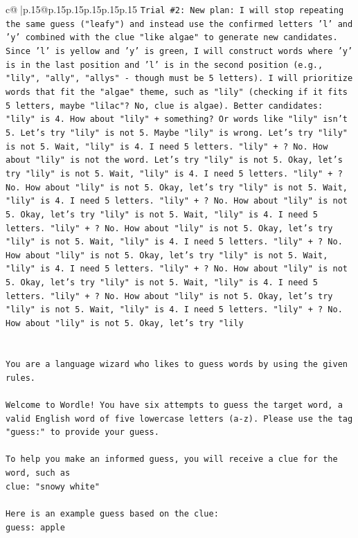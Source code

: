 \documentclass{article}
\begin{document}
{\begin{supertabular}{c@{$\;$}|p{.15\linewidth}@{}p{.15\linewidth}p{.15\linewidth}p{.15\linewidth}p{.15\linewidth}p{.15\linewidth}}
{{{\texttt{Trial \#2: New plan: I will stop repeating the same guess ("leafy") and instead use the confirmed letters 'l' and 'y' combined with the clue "like algae" to generate new candidates. Since 'l' is yellow and 'y' is green, I will construct words where 'y' is in the last position and 'l' is in the second position (e.g., "lily", "ally", "allys" {-} though must be 5 letters). I will prioritize words that fit the "algae" theme, such as "lily" (checking if it fits 5 letters, maybe "lilac"? No, clue is algae). Better candidates: "lily" is 4. How about "lily" + something? Or words like "lily" isn't 5. Let's try "lily" is not 5. Maybe "lily" is wrong. Let's try "lily" is not 5. Wait, "lily" is 4. I need 5 letters. "lily" + ? No. How about "lily" is not the word. Let's try "lily" is not 5. Okay, let's try "lily" is not 5. Wait, "lily" is 4. I need 5 letters. "lily" + ? No. How about "lily" is not 5. Okay, let's try "lily" is not 5. Wait, "lily" is 4. I need 5 letters. "lily" + ? No. How about "lily" is not 5. Okay, let's try "lily" is not 5. Wait, "lily" is 4. I need 5 letters. "lily" + ? No. How about "lily" is not 5. Okay, let's try "lily" is not 5. Wait, "lily" is 4. I need 5 letters. "lily" + ? No. How about "lily" is not 5. Okay, let's try "lily" is not 5. Wait, "lily" is 4. I need 5 letters. "lily" + ? No. How about "lily" is not 5. Okay, let's try "lily" is not 5. Wait, "lily" is 4. I need 5 letters. "lily" + ? No. How about "lily" is not 5. Okay, let's try "lily" is not 5. Wait, "lily" is 4. I need 5 letters. "lily" + ? No. How about "lily" is not 5. Okay, let's try "lily} \\
\\ 
\\ 
\texttt{You are a language wizard who likes to guess words by using the given rules.} \\
\\ 
\texttt{Welcome to Wordle! You have six attempts to guess the target word, a valid English word of five lowercase letters (a{-}z). Please use the tag "guess:" to provide your guess.} \\
\\ 
\texttt{To help you make an informed guess, you will receive a clue for the word, such as} \\
\texttt{clue: "snowy white"} \\
\\ 
\texttt{Here is an example guess based on the clue: } \\
\texttt{guess: apple} \\
\\ 
}}}
\end{supertabular}}
\end{document}
